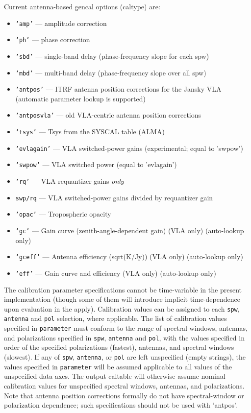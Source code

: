 Current antenna-based gencal options (caltype) are:
\begin{itemize}
   \item {\tt 'amp'} --- amplitude correction
   \item {\tt 'ph'} --- phase correction
   \item {\tt 'sbd'} --- single-band delay (phase-frequency slope for each spw)
   \item {\tt 'mbd'} --- multi-band delay (phase-frequency slope over all spw)
   \item {\tt 'antpos'} --- ITRF antenna position corrections for the
     Jansky VLA (automatic parameter lookup is supported)
   \item {\tt 'antposvla'} --- old VLA-centric antenna position
     corrections 
   \item {\tt 'tsys'} --- Tsys from the SYSCAL table (ALMA)
   \item {\tt 'evlagain'} --- VLA switched-power gains (experimental;
     equal to 'swpow')
   \item {\tt 'swpow'} --- VLA switched power (equal to 'evlagain')
   \item {\tt 'rq'} --- VLA requantizer gains {\it only} 
   \item {\tt swp/rq} --- VLA switched-power gains divided by requantizer gain
   \item {\tt 'opac'} --- Tropospheric opacity
    \item {\tt 'gc'} --- Gain curve (zenith-angle-dependent gain) (VLA
    only) (auto-lookup only)
    \item {\tt 'gceff'} --- Antenna efficiency (sqrt(K/Jy)) (VLA only) (auto-lookup only)
    \item {\tt 'eff'} --- Gain curve and efficiency (VLA only) (auto-lookup only)
\end{itemize}

The calibration parameter specifications cannot be time-variable in the present
implementation (though some of them will introduce implicit
time-dependence upon evaluation in the apply).  Calibration values can be assigned to each {\tt spw},
{\tt antenna} and {\tt pol} selection, where applicable.  The list 
of calibration values specified in {\tt parameter} must conform to
the range of spectral windows, antennas, and polarizations specified
in {\tt spw}, {\tt antenna} and {\tt pol}, with the values specified
in order of the specified polarizations (fastest), antennas, and spectral
windows (slowest).  If any of {\tt spw}, 
{\tt antenna}, or {\tt pol} are left unspecified (empty strings), the
values specified in {\tt parameter} will be assumed applicable to
all values of the unspecified data axes. The output caltable will
otherwise assume nominal calibration values for unspecified spectral
windows, antennas, and polarizations.  Note that antenna position
corrections formally do not have spectral-window or polarization
dependence; such specifications should not be used with 'antpos'.

